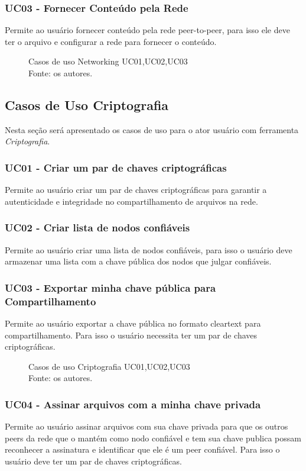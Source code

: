 \subsubsection{UC03 - Fornecer Conteúdo pela Rede}
Permite ao usuário fornecer conteúdo pela rede peer-to-peer, para isso ele deve ter o arquivo e configurar a rede para fornecer o conteúdo.
\begin{figure}[H]
    \centering
    
    \caption[Casos de uso Networking UC01,UC02,UC03]{\label{fig:Ator_Networking2}
        Casos de uso Networking UC01,UC02,UC03\\
        Fonte: os autores.
    }
\end{figure}
\subsection{Casos de Uso Criptografia}
Nesta seção será apresentado os casos de uso para o ator usuário com ferramenta \textit{Criptografia}.
\subsubsection{UC01 - Criar um par de chaves criptográficas}
Permite ao usuário criar um par de chaves criptográficas para garantir a autenticidade e integridade no compartilhamento de arquivos na rede.
\subsubsection{UC02 - Criar lista de nodos confiáveis}
Permite ao usuário criar uma lista de nodos confiáveis, para isso o usuário deve armazenar uma lista com a chave pública dos nodos que julgar confiáveis.
\subsubsection{UC03 - Exportar minha chave pública para Compartilhamento}
Permite ao usuário exportar a chave pública no formato cleartext para compartilhamento. Para isso o usuário necessita ter um par de chaves criptográficas. 
\begin{figure}[H]
    \centering
    
    \caption[Casos de uso Criptografia UC01,UC02,UC03]{\label{fig:Ator_Crypto1}
        Casos de uso Criptografia UC01,UC02,UC03\\
        Fonte: os autores.
    }
\end{figure}
\subsubsection{UC04 - Assinar arquivos com a minha chave privada}
Permite ao usuário assinar arquivos com sua chave privada para que os outros peers da rede que o mantém como nodo confiável e tem sua chave publica possam reconhecer a assinatura e identificar que ele é um peer confiável. Para isso o usuário deve ter um par de chaves criptográficas.
